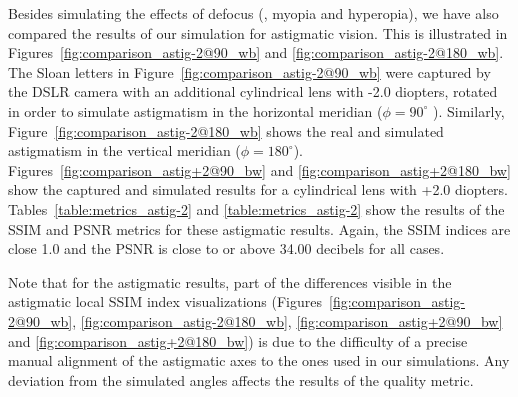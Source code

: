 Besides simulating the effects of defocus (\ie, myopia and hyperopia), we have also compared the results of our simulation for astigmatic vision.
This is illustrated in Figures~\ref{fig:comparison_astig-2@90_wb} and \ref{fig:comparison_astig-2@180_wb}.
The Sloan letters in Figure~\ref{fig:comparison_astig-2@90_wb} were captured by the DSLR camera with an additional cylindrical lens with -2.0 diopters, rotated in order to simulate astigmatism in the horizontal meridian ($\phi = 90^{\circ}$ ). Similarly, Figure~\ref{fig:comparison_astig-2@180_wb} shows the real and simulated astigmatism in the vertical meridian ($\phi = 180^{\circ}$). 
Figures~\ref{fig:comparison_astig+2@90_bw} and \ref{fig:comparison_astig+2@180_bw} show the captured and simulated results for a cylindrical lens with +2.0 diopters. 
Tables~\ref{table:metrics_astig-2} and \ref{table:metrics_astig-2} show the results of the SSIM and PSNR metrics for these astigmatic results. Again, the SSIM indices are close 1.0 and the PSNR is close to or above 34.00 decibels for all cases.

Note that for the astigmatic results, part of the differences visible in 
the astigmatic local SSIM index visualizations (Figures~\ref{fig:comparison_astig-2@90_wb}, \ref{fig:comparison_astig-2@180_wb}, \ref{fig:comparison_astig+2@90_bw} and \ref{fig:comparison_astig+2@180_bw}) is due to the difficulty of a precise manual alignment of the astigmatic axes to the ones used in our simulations. Any deviation from the simulated angles affects the results of the quality metric.





